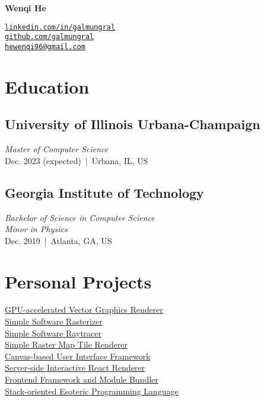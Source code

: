 \documentclass[11pt]{article}
\begin{document}
 
\centering

\begin{minipage}{250pt}
{\Huge\bf Wenqi He}

\vspace{10pt}
\texttt{\href{https://linkedin.com/in/galmungral}{linkedin.com/in/galmungral}\\
\href{https://github.com/galmungral}{github.com/galmungral}\\
\href{mailto:hewenqi96@gmail.com}{hewenqi96@gmail.com}
}

\section*{\sc Education}

\subsection*{University of Illinois Urbana-Champaign}
\textit{Master of Computer Science}\\
Dec. 2023 (expected) \,|\, Urbana, IL, US

\subsection*{Georgia Institute of Technology}
\textit{Bachelor of Science in Computer Science}\\
\textit{Minor in Physics}\\
Dec. 2019 \,|\, Atlanta, GA, US

\section*{\sc Personal Projects}

\href{https://github.com/galmungral/polyrender}{GPU-accelerated Vector Graphics Renderer}\\
\href{https://github.com/galmungral/rasterizer}{Simple Software Rasterizer}\\
\href{https://github.com/galmungral/simple-raytracer}{Simple Software Raytracer}\\
\href{https://github.com/galmungral/mercator}{Simple Raster Map Tile Renderer}\\
\href{https://github.com/galmungral/michelangelo}{Canvas-based User Interface Framework}\\
\href{https://github.com/galmungral/react-teletype}{Server-side Interactive React Renderer} \\
\href{https://github.com/galmungral/replay}{Frontend Framework and Module Bundler}\\
\href{https://github.com/galmungral/hanbun-lang}{Stack-oriented Esoteric Programming Language}



\end{minipage}
\end{document}
